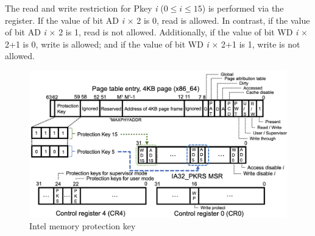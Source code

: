 The read and write restriction for Pkey {\it i} ($0 \leq i \leq 15$) is performed via the
register. If the value of bit AD {\it i} $\times$ 2 is 0, read is allowed. In contrast,
if the value of bit AD {\it i} $\times$ 2 is 1, read is not allowed.
%
Additionally, if the value of bit WD {\it i} $\times$ 2+1 is 0, write is allowed; and if the
value of bit WD {\it i} $\times$ 2+1 is 1, write is not allowed.


\begin{figure}[t]
  \begin{center}
    \hspace{-5.5ex}
    \includegraphics[bb=0 0 1311 744, scale=.200]{./imgs/002_screenshot_2021-07-26_19.13.09.png}
  \end{center}
  \caption{
    Intel memory protection key \cite{intel-mpk}
  }
 \label{fig:mpk_overview}
\end{figure}




